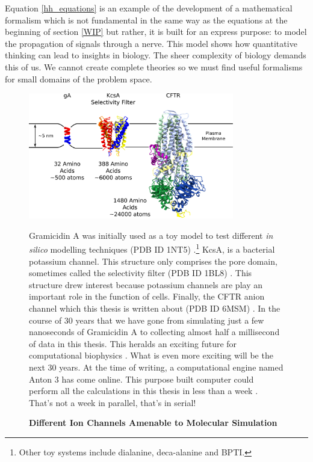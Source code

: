 Equation \ref{hh_equations} is an example of the development of a mathematical formalism which is not fundamental in the same way as the equations at the beginning of section \ref{WIP} but rather, it is built for an express purpose: to model the propagation of signals through a nerve. This model shows how quantitative thinking can lead to insights in biology. The sheer complexity of biology demands this of us. We cannot create complete theories so we must find useful formalisms for small domains of the problem space.

\begin{figure}
	\begin{center}
		\includegraphics[width=0.8\textwidth]{figures/ion_channel_progression.pdf}
	\end{center}
	\captionsetup{singlelinecheck = false, justification=raggedright}
	\caption[Different Ion Channels Amenable to Molecular Simulation] {\textbf{Different Ion Channels Amenable to Molecular Simulation}}{Gramicidin A was initially used as a toy model to test different \textit{in silico} modelling techniques (PDB ID 1NT5) \cite{sham2003}.\footnote{Other toy systems include dialanine, deca-alanine and BPTI.} KcsA, is a bacterial potassium channel. This structure only comprises the pore domain, sometimes called the selectivity filter (PDB ID 1BL8) \cite{doyle1998}. This structure drew interest because potassium channels are play an important role in the function of cells. Finally, the CFTR anion channel which this thesis is written about (PDB ID 6MSM) \cite{zhang2018a}. In the course of 30 years that we have gone from simulating just a few nanoseconds of Gramicidin A to collecting almost half a millisecond of data in this thesis. This heralds an exciting future for computational biophysics \cite{roux1993}. What is even more exciting will be the next 30 years. At the time of writing, a computational engine named Anton 3 has come online. This purpose built computer could perform all the calculations in this thesis in less than a week \cite{jones2022, russell2021}. That's not a week in parallel, that's in serial!}
	\label{ion_channel_progress}
\end{figure}

